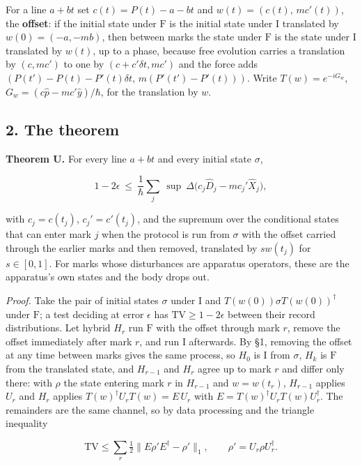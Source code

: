 \documentclass[11pt,a4paper]{article}
\begin{document}
For a line \(a+bt\) set \(c(t)=P(t)-a-bt\) and \(w(t)=(c(t),\,mc'(t))\),
the \textbf{offset}: if the initial state under \(\mathrm F\) is the
initial state under \(\mathrm I\) translated by \(w(0)=(-a,-mb)\), then
between marks the state under \(\mathrm F\) is the state under
\(\mathrm I\) translated by \(w(t)\), up to a phase, because free
evolution carries a translation by \((c,mc')\) to one by
\((c+c'\delta t,mc')\) and the force adds
\((P(t')-P(t)-P'(t)\delta t,\,m(P'(t')-P'(t)))\). Write
\(T(w)=e^{-iG_w}\), \(G_w=(c\hat p-mc'\hat y)/\hbar\), for the
translation by \(w\).

\hypertarget{the-theorem}{%
\subsection{2. The theorem}\label{the-theorem}}

\textbf{Theorem U.} For every line \(a+bt\) and every initial state
\(\sigma\),

\[1-2\epsilon\ \le\ \frac1\hbar\sum_j\ \sup\ \Delta\bigl(c_j\hat D_j-mc_j'\hat X_j\bigr),\]

with \(c_j=c(t_j)\), \(c_j'=c'(t_j)\), and the supremum over the
conditional states that can enter mark \(j\) when the protocol is run
from \(\sigma\) with the offset carried through the earlier marks and
then removed, translated by \(sw(t_j)\) for \(s\in[0,1]\). For marks
whose disturbances are apparatus operators, these are the apparatus's
own states and the body drops out.

\emph{Proof.} Take the pair of initial states \(\sigma\) under
\(\mathrm I\) and \(T(w(0))\sigma T(w(0))^\dagger\) under \(\mathrm F\);
a test deciding at error \(\epsilon\) has \(\mathrm{TV}\ge1-2\epsilon\)
between their record distributions. Let hybrid \(H_r\) run \(\mathrm F\)
with the offset through mark \(r\), remove the offset immediately after
mark \(r\), and run \(\mathrm I\) afterwards. By §1, removing the offset
at any time between marks gives the same process, so \(H_0\) is
\(\mathrm I\) from \(\sigma\), \(H_k\) is \(\mathrm F\) from the
translated state, and \(H_{r-1}\) and \(H_r\) agree up to mark \(r\) and
differ only there: with \(\rho\) the state entering mark \(r\) in
\(H_{r-1}\) and \(w=w(t_r)\), \(H_{r-1}\) applies \(U_r\) and \(H_r\)
applies \(T(w)^\dagger U_rT(w)=E\,U_r\) with
\(E=T(w)^\dagger U_rT(w)U_r^\dagger\). The remainders are the same
channel, so by data processing and the triangle inequality

\[\mathrm{TV}\le\sum_r\tfrac12\bigl\|E\rho'E^\dagger-\rho'\bigr\|_1,\qquad\rho'=U_r\rho U_r^\dagger .\]
\end{document}
